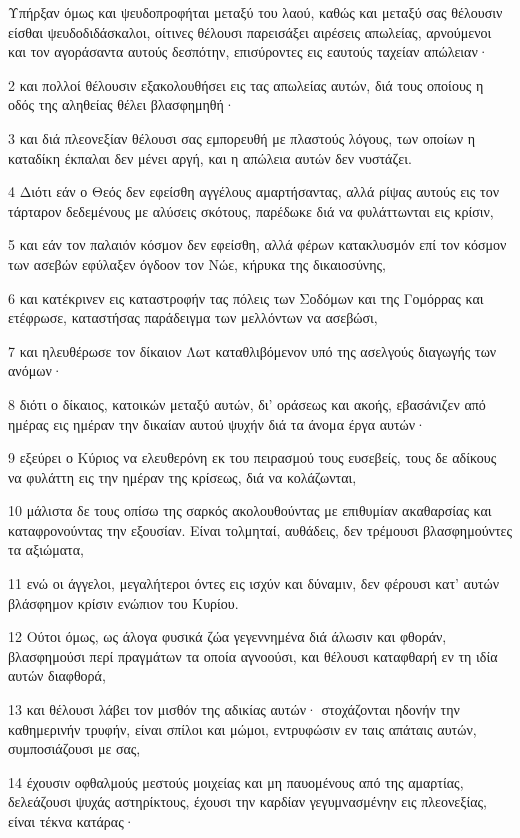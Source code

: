 \par Υπήρξαν όμως και ψευδοπροφήται μεταξύ του λαού, καθώς και μεταξύ σας θέλουσιν είσθαι ψευδοδιδάσκαλοι, οίτινες θέλουσι παρεισάξει αιρέσεις απωλείας, αρνούμενοι και τον αγοράσαντα αυτούς δεσπότην, επισύροντες εις εαυτούς ταχείαν απώλειαν·
\par 2 και πολλοί θέλουσιν εξακολουθήσει εις τας απωλείας αυτών, διά τους οποίους η οδός της αληθείας θέλει βλασφημηθή·
\par 3 και διά πλεονεξίαν θέλουσι σας εμπορευθή με πλαστούς λόγους, των οποίων η καταδίκη έκπαλαι δεν μένει αργή, και η απώλεια αυτών δεν νυστάζει.
\par 4 Διότι εάν ο Θεός δεν εφείσθη αγγέλους αμαρτήσαντας, αλλά ρίψας αυτούς εις τον τάρταρον δεδεμένους με αλύσεις σκότους, παρέδωκε διά να φυλάττωνται εις κρίσιν,
\par 5 και εάν τον παλαιόν κόσμον δεν εφείσθη, αλλά φέρων κατακλυσμόν επί τον κόσμον των ασεβών εφύλαξεν όγδοον τον Νώε, κήρυκα της δικαιοσύνης,
\par 6 και κατέκρινεν εις καταστροφήν τας πόλεις των Σοδόμων και της Γομόρρας και ετέφρωσε, καταστήσας παράδειγμα των μελλόντων να ασεβώσι,
\par 7 και ηλευθέρωσε τον δίκαιον Λωτ καταθλιβόμενον υπό της ασελγούς διαγωγής των ανόμων·
\par 8 διότι ο δίκαιος, κατοικών μεταξύ αυτών, δι' οράσεως και ακοής, εβασάνιζεν από ημέρας εις ημέραν την δικαίαν αυτού ψυχήν διά τα άνομα έργα αυτών·
\par 9 εξεύρει ο Κύριος να ελευθερόνη εκ του πειρασμού τους ευσεβείς, τους δε αδίκους να φυλάττη εις την ημέραν της κρίσεως, διά να κολάζωνται,
\par 10 μάλιστα δε τους οπίσω της σαρκός ακολουθούντας με επιθυμίαν ακαθαρσίας και καταφρονούντας την εξουσίαν. Είναι τολμηταί, αυθάδεις, δεν τρέμουσι βλασφημούντες τα αξιώματα,
\par 11 ενώ οι άγγελοι, μεγαλήτεροι όντες εις ισχύν και δύναμιν, δεν φέρουσι κατ' αυτών βλάσφημον κρίσιν ενώπιον του Κυρίου.
\par 12 Ούτοι όμως, ως άλογα φυσικά ζώα γεγεννημένα διά άλωσιν και φθοράν, βλασφημούσι περί πραγμάτων τα οποία αγνοούσι, και θέλουσι καταφθαρή εν τη ιδία αυτών διαφθορά,
\par 13 και θέλουσι λάβει τον μισθόν της αδικίας αυτών· στοχάζονται ηδονήν την καθημερινήν τρυφήν, είναι σπίλοι και μώμοι, εντρυφώσιν εν ταις απάταις αυτών, συμποσιάζουσι με σας,
\par 14 έχουσιν οφθαλμούς μεστούς μοιχείας και μη παυομένους από της αμαρτίας, δελεάζουσι ψυχάς αστηρίκτους, έχουσι την καρδίαν γεγυμνασμένην εις πλεονεξίας, είναι τέκνα κατάρας·

